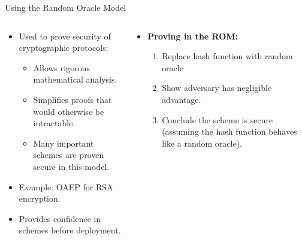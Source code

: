 \documentclass[aspectratio=169, lualatex, handout]{beamer}
\begin{document}
\begin{frame}{Using the Random Oracle Model}
	\begin{columns}[c]
		\begin{column}{0.5\textwidth}
			\begin{itemize}[<+->]
				\item Used to prove security of cryptographic protocols:
				      \begin{itemize}
					      \item Allows rigorous mathematical analysis.
					      \item Simplifies proofs that would otherwise be intractable.
					      \item Many important schemes are proven secure in this model.
				      \end{itemize}
				\item Example: OAEP for RSA encryption.
				\item Provides confidence in schemes before deployment.
			\end{itemize}
		\end{column}
		\begin{column}{0.5\textwidth}
			\begin{itemize}[<+->]
				\item \textbf{Proving in the ROM:}
				      \begin{enumerate}
					      \item Replace hash function with random oracle
					      \item Show adversary has negligible advantage.
					      \item Conclude the scheme is secure (assuming the hash function behaves like a random oracle).
				      \end{enumerate}
			\end{itemize}
		\end{column}
	\end{columns}
\end{frame}
\end{document}
